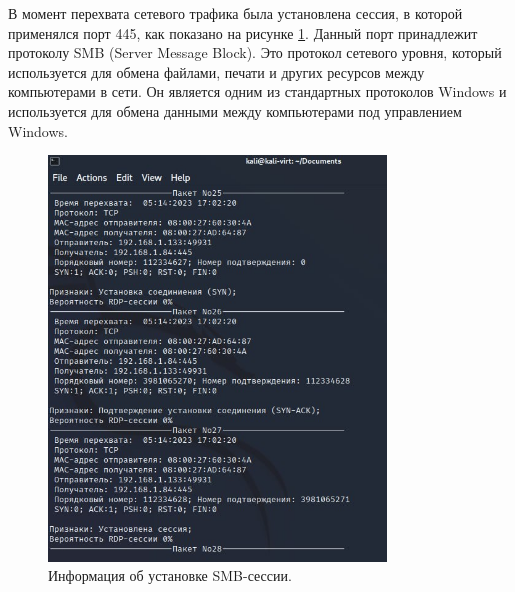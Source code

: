 \documentclass[bachelor, och, coursework]{SCWorks}
\begin{document}
В момент перехвата сетевого трафика была установлена сессия, в которой применялся порт 445, как показано на рисунке \ref{smb1}.
Данный порт принадлежит протоколу SMB (Server Message Block). Это протокол сетевого уровня, который используется для обмена 
файлами, печати и других ресурсов между компьютерами в сети. Он является одним из стандартных протоколов Windows и используется 
для обмена данными между компьютерами под управлением Windows.


\begin{figure}[H]
  \centering
  \includegraphics[width=0.8\textwidth]{photo/smb1.jpg}
  \caption{Информация об установке SMB-сессии.}
  \label{smb1}
\end{figure}





\end{document}
